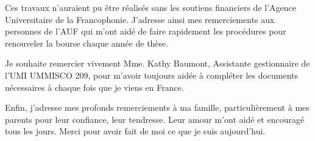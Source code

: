Ces travaux n'auraient pu être réalisés sans les soutiens financiers de l'Agence Universitaire de la Francophonie. J'adresse ainsi mes remerciements aux personnes de l'AUF qui m'ont aidé de faire rapidement les procédures pour renouveler la bourse chaque année de thèse.

Je souhaite remercier vivement Mme. Kathy Baumont, Assistante gestionnaire de l'UMI UMMISCO 209, pour m'avoir toujours aidée à compléter les documents nécessaires à chaque fois que je viens en France.


Enfin, j'adresse mes profonds remerciements à ma famille, particulièrement à mes parents pour leur confiance, leur tendresse. Leur amour m'ont aidé et encouragé tous les jours. Merci pour avoir fait de moi ce que je suis aujourd'hui.


%
